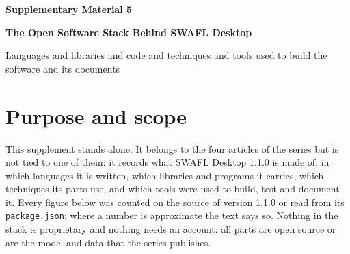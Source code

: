 
\renewcommand{\thesection}{S\arabic{section}}
\renewcommand{\thetable}{S\arabic{table}}


\begin{center}{\large\bfseries Supplementary Material 5\par}\vspace{4pt}
{\Large\bfseries The Open Software Stack Behind SWAFL Desktop\par}\vspace{4pt}
{\normalsize Languages and libraries and code and techniques and tools used to build the software and its documents\par}\end{center}
\authorblock
\tableofcontents
\clearpage

\section{Purpose and scope}
This supplement stands alone. It belongs to the four articles of the series but is not tied to one of them: it records what SWAFL Desktop 1.1.0 is made of, in which languages it is written, which libraries and programs it carries, which techniques its parts use, and which tools were used to build, test and document it. Every figure below was counted on the source of version 1.1.0 or read from its \texttt{package.json}; where a number is approximate the text says so. Nothing in the stack is proprietary and nothing needs an account: all parts are open source or are the model and data that the series publishes.

